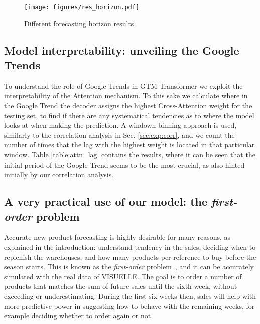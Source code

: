 \documentclass{article}
\newcommand{\datasetname}[0] {VISUELLE}
\newcommand{\approachname}[0] {GTM-Transformer\xspace}
\begin{document}
\begin{figure}[h]
    \centering
    \texttt{[image: figures/res\_horizon.pdf]}
    \caption{Different forecasting horizon results}
    \label{fig:hor_results}
\end{figure}
 

\subsection{Model interpretability: unveiling the Google Trends}\label{sec:exp:interpretability}
To understand the role of Google Trends in \approachname we exploit the interpretability of the Attention mechanism. To this sake we calculate where in the Google Trend the decoder assigns the highest Cross-Attention weight for the testing set, to find if there are any systematical tendencies as to where the model looks at when making the prediction. A windown binning approach is used, similarly to the correlation analysis in Sec. \ref{sec:exp:corr}, and we count the number of times that the lag with the highest weight is located in that particular window. Table \ref{table:attn_lag} contains the results, where it can be seen that the initial period of the Google Trend seems to be the most crucial, as also hinted initially by our correlation analysis.

\begin{table}[h]\footnotesize
\centering
{}
\vspace{0.15cm}
\caption{Points of the Google Trends time series with the highest Cross-attention weights}
\label{table:attn_lag}
\end{table}

\subsection{A very practical use of our model: the \emph{first-order} problem}\label{sec:exp:fo}
Accurate new product forecasting is highly desirable for many reasons, as explained in the introduction: understand tendency in the sales, deciding when to replenish the warehouses, and how many products per reference to buy before the season starts. This is known as the \emph{first-order} problem~\cite{donohue2000efficient}, and it can be accurately simulated with the real data of \datasetname.  The goal is to order a number of products that matches the sum of future sales until the sixth week, without exceeding or underestimating. During the first six weeks then, sales will help with more predictive power in suggesting how to behave with the remaining weeks, for example deciding whether to order again or not.   
\end{document}
